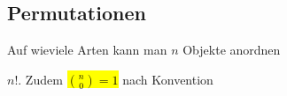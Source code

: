 \subsection{Permutationen}
{\scriptsize Auf wieviele Arten kann man $n$ Objekte anordnen}

 $n!$. Zudem \hl{${n \choose 0} = 1$} nach Konvention
